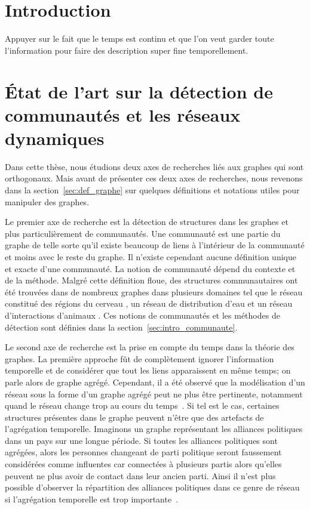 
\chapter*{Introduction}

Appuyer sur le fait que le temps est continu et que l'on veut garder toute l'information pour faire des description super fine temporellement.

\chapter{État de l'art sur la détection de communautés et les réseaux dynamiques}
\minitoc
\label{chap:etat_art}
Dans cette thèse, nous étudions deux axes de recherches liés aux graphes qui sont orthogonaux.
Mais avant de présenter ces deux axes de recherches, nous revenons dans la section~\ref{sec:def_graphe} sur quelques définitions et notations utiles pour manipuler des graphes.

Le premier axe de recherche est la détection de structures dans les graphes et plus particulièrement de communautés.
Une communauté est une partie du graphe de telle sorte qu'il existe beaucoup de liens à l'intérieur de la communauté et moins avec le reste du graphe.
Il n'existe cependant aucune définition unique et exacte d'une communauté.
La notion de communauté dépend du contexte et de la méthode.
Malgré cette définition floue, des structures communautaires ont été trouvées dans de nombreux graphes dans plusieurs domaines tel que le réseau constitué des régions du cerveau \cite{DeReus2014}, un réseau de distribution d'eau \cite{DiNardo2015} et un réseau d'interactions d'animaux \cite{Farine2015}.
Ces notions de communautés et les méthodes de détection sont définies dans la section~\ref{sec:intro_communaute}.

Le second axe de recherche est la prise en compte du temps dans la théorie des graphes.
La première approche fût de complètement ignorer l'information temporelle et de considérer que tout les liens apparaissent en même temps; on parle alors de graphe agrégé.
Cependant, il a été observé que la modélisation d'un réseau sous la forme d'un graphe agrégé peut ne plus être pertinente, notamment quand le réseau change trop au cours du temps~\cite{Holme2015b}.
Si tel est le cas, certaines structures présentes dans le graphe peuvent n'être que des artefacts de l'agrégation temporelle.
Imaginons un graphe représentant les alliances politiques dans un pays sur une longue période.
Si toutes les alliances politiques sont agrégées, alors les personnes changeant de parti politique seront faussement considérées comme influentes car connectées à plusieurs partis alors qu'elles peuvent ne plus avoir de contact dans leur ancien parti.
Ainsi il n'est plus possible d'observer la répartition des alliances politiques dans ce genre de réseau si l'agrégation temporelle est trop importante~\cite{Mucha2010}.

